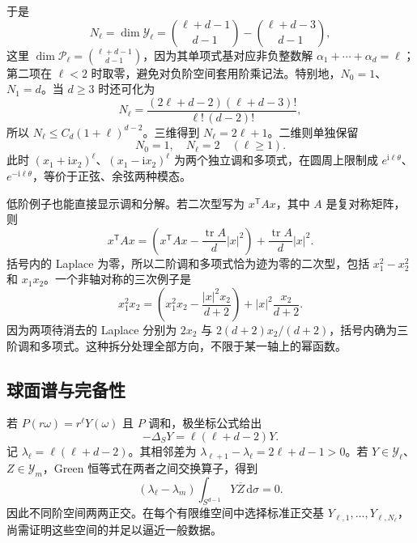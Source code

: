 于是
\[N_\ell=\dim\mathcal Y_\ell
 =\binom{\ell+d-1}{d-1}-\binom{\ell+d-3}{d-1},\]
这里 \(\dim\mathcal P_\ell=\binom{\ell+d-1}{d-1}\)，因为其单项式基对应非负整数解
\(\alpha_1+\cdots+\alpha_d=\ell\)；第二项在 \(\ell<2\) 时取零，避免对负阶空间套用阶乘记法。特别地，\(N_0=1\)、\(N_1=d\)。当 \(d\geq3\) 时还可化为
\[
 N_\ell=\frac{(2\ell+d-2)(\ell+d-3)!}
                   {\ell!\,(d-2)!},
\]
所以 \(N_\ell\leq C_d(1+\ell)^{d-2}\)。三维得到
\(N_\ell=2\ell+1\)。二维则单独保留
\[
 N_0=1,\quad N_\ell=2\quad(\ell\geq1).
\]
此时 \((x_1+\mathrm ix_2)^\ell\)、\((x_1-\mathrm ix_2)^\ell\) 为两个独立调和多项式，在圆周上限制成 \(e^{\mathrm i\ell\theta}\)、\(e^{-\mathrm i\ell\theta}\)，等价于正弦、余弦两种模态。

\ProseParagraphBreak

低阶例子也能直接显示调和分解。若二次型写为 \(x^{\mathsf T}Ax\)，其中 \(A\) 是复对称矩阵，则
\[
 x^{\mathsf T}Ax
 =\left(x^{\mathsf T}Ax-\frac{\operatorname{tr}A}{d}|x|^2\right)
       +\frac{\operatorname{tr}A}{d}|x|^2.
\]
括号内的 Laplace 为零，所以二阶调和多项式恰为迹为零的二次型，包括 \(x_1^2-x_2^2\) 和 \(x_1x_2\)。一个非轴对称的三次例子是
\[
 x_1^2x_2
 =\left(x_1^2x_2-\frac{|x|^2x_2}{d+2}\right)
       +|x|^2\frac{x_2}{d+2}.
\]
因为两项待消去的 Laplace 分别为 \(2x_2\) 与
\(2(d+2)x_2/(d+2)\)，括号内确为三阶调和多项式。这种拆分处理全部方向，不限于某一轴上的幂函数。

\subsection{球面谱与完备性}
\label{b2:subsec:B20303}

若 \(P(r\omega)=r^\ell Y(\omega)\) 且 \(P\) 调和，极坐标公式给出
\[-\Delta_SY=\ell(\ell+d-2)Y.\]
记 \(\lambda_\ell=\ell(\ell+d-2)\)。其相邻差为
\(\lambda_{\ell+1}-\lambda_\ell=2\ell+d-1>0\)。若
\(Y\in\mathcal Y_\ell\)、\(Z\in\mathcal Y_m\)，Green 恒等式在两者之间交换算子，得到
\[
 (\lambda_\ell-\lambda_m)
       \int_{S^{d-1}}Y\overline Z\,\mathrm d\sigma=0.
\]
因此不同阶空间两两正交。在每个有限维空间中选择标准正交基
\(Y_{\ell,1},\ldots,Y_{\ell,N_\ell}\)，尚需证明这些空间的并足以逼近一般数据。

